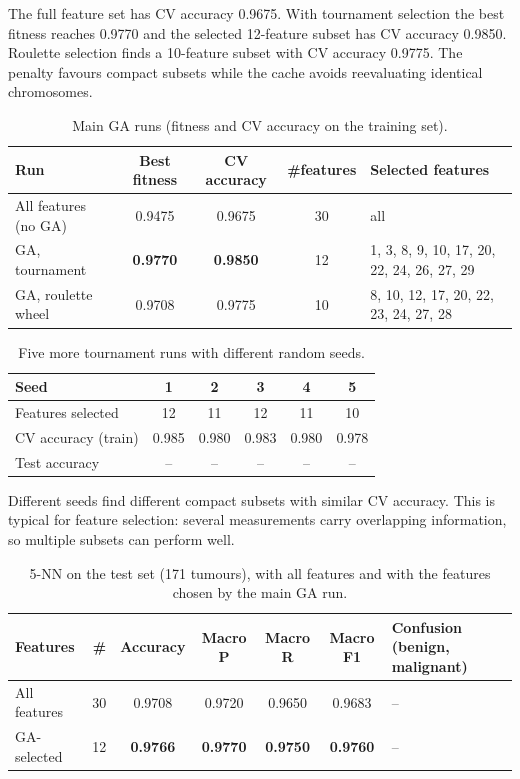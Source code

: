 The full feature set has CV accuracy 0.9675. With tournament selection the best fitness reaches 0.9770
and the selected 12-feature subset has CV accuracy 0.9850. Roulette selection finds a 10-feature subset
with CV accuracy 0.9775. The penalty favours compact subsets while the cache avoids reevaluating identical
chromosomes.

\begin{table}[H]
\centering\small
\caption{Main GA runs (fitness and CV accuracy on the training set).}
\label{tab:ga-runs}
\begin{tabular}{@{}l c c c l@{}}
\toprule
\textbf{Run} & \textbf{Best fitness} & \textbf{CV accuracy} & \textbf{\#features} & \textbf{Selected features}\\
\midrule
All features (no GA) & 0.9475 & 0.9675 & 30 & all\\
GA, tournament & \textbf{0.9770} & \textbf{0.9850} & 12 & 1, 3, 8, 9, 10, 17, 20, 22, 24, 26, 27, 29\\
GA, roulette wheel & 0.9708 & 0.9775 & 10 & 8, 10, 12, 17, 20, 22, 23, 24, 27, 28\\
\bottomrule
\end{tabular}
\end{table}

\begin{table}[H]
\centering\small
\caption{Five more tournament runs with different random seeds.}
\label{tab:ga-seeds}
\begin{tabular}{@{}l c c c c c@{}}
\toprule
Seed & 1 & 2 & 3 & 4 & 5\\
\midrule
Features selected & 12 & 11 & 12 & 11 & 10\\
CV accuracy (train) & 0.985 & 0.980 & 0.983 & 0.980 & 0.978\\
Test accuracy & -- & -- & -- & -- & --\\
\bottomrule
\end{tabular}
\end{table}

Different seeds find different compact subsets with similar CV accuracy. This is typical for feature
selection: several measurements carry overlapping information, so multiple subsets can perform well.

\begin{table}[H]
\centering\small
\caption{5-NN on the test set (171 tumours), with all features and with the features chosen by the main GA run.}
\label{tab:ga-test}
\begin{tabular}{@{}l c S[table-format=1.4] S[table-format=1.4] S[table-format=1.4] S[table-format=1.4] l@{}}
\toprule
\textbf{Features} & \textbf{\#} & {\textbf{Accuracy}} & {\textbf{Macro P}} & {\textbf{Macro R}} & {\textbf{Macro F1}} & \textbf{Confusion (benign, malignant)}\\
\midrule
All features & 30 & 0.9708 & 0.9720 & 0.9650 & 0.9683 & --\\
GA-selected  & 12 & \bfseries 0.9766 & \bfseries 0.9770 & \bfseries 0.9750 & \bfseries 0.9760 & --\\
\bottomrule
\end{tabular}
\end{table}

